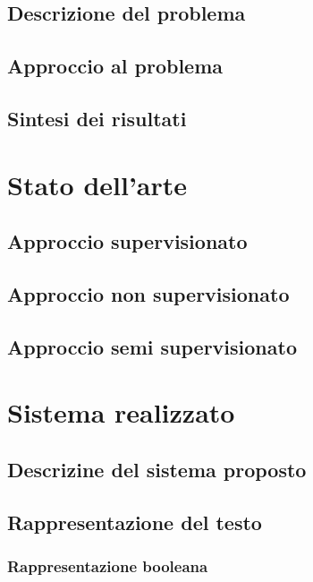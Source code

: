 \documentclass[oneside]{book}
\begin{document}
\section*{Descrizione del problema}

\section*{Approccio al problema}

\section*{Sintesi dei risultati}




\chapter{Stato dell'arte}

\section{Approccio supervisionato}

\section{Approccio non supervisionato}

\section{Approccio semi supervisionato}




\chapter{Sistema realizzato}

\section{Descrizine del sistema proposto}

\section{Rappresentazione del testo}

\subsection{Rappresentazione booleana}
\end{document}
